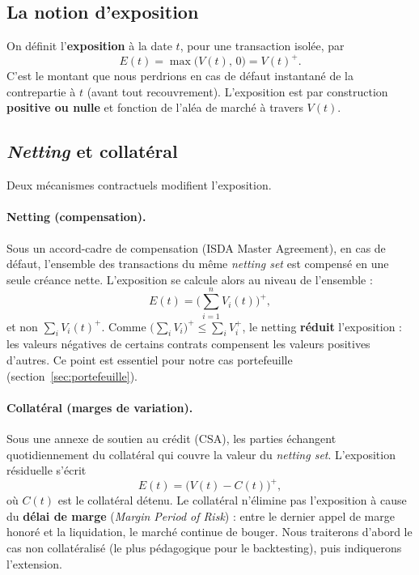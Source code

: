 \documentclass[11pt,a4paper]{article}
\theoremstyle{remark}
\begin{document}
\subsection{La notion d'exposition}

On définit l'\textbf{exposition} à la date $t$, pour une transaction isolée, par
\begin{equation}
E(t) = \max\big(V(t),\, 0\big) = V(t)^{+}.
\end{equation}
C'est le montant que nous perdrions en cas de défaut instantané de la contrepartie à $t$ (avant tout recouvrement). L'exposition est par construction \textbf{positive ou nulle} et fonction de l'aléa de marché à travers $V(t)$.

\subsection{\emph{Netting} et collatéral}

Deux mécanismes contractuels modifient l'exposition.

\paragraph{Netting (compensation).} Sous un accord-cadre de compensation (ISDA Master Agreement), en cas de défaut, l'ensemble des transactions du même \emph{netting set} est compensé en une seule créance nette. L'exposition se calcule alors au niveau de l'ensemble :
\begin{equation}
E(t) = \Big(\sum_{i=1}^{n} V_i(t)\Big)^{+},
\end{equation}
et non $\sum_i V_i(t)^{+}$. Comme $\big(\sum_i V_i\big)^{+} \le \sum_i V_i^{+}$, le netting \textbf{réduit} l'exposition : les valeurs négatives de certains contrats compensent les valeurs positives d'autres. Ce point est essentiel pour notre cas portefeuille (section~\ref{sec:portefeuille}).

\paragraph{Collatéral (marges de variation).} Sous une annexe de soutien au crédit (CSA), les parties échangent quotidiennement du collatéral qui couvre la valeur du \emph{netting set}. L'exposition résiduelle s'écrit
\begin{equation}
E(t) = \big(V(t) - C(t)\big)^{+},
\end{equation}
où $C(t)$ est le collatéral détenu. Le collatéral n'élimine pas l'exposition à cause du \textbf{délai de marge} (\emph{Margin Period of Risk}) : entre le dernier appel de marge honoré et la liquidation, le marché continue de bouger. Nous traiterons d'abord le cas non collatéralisé (le plus pédagogique pour le backtesting), puis indiquerons l'extension.
\end{document}
